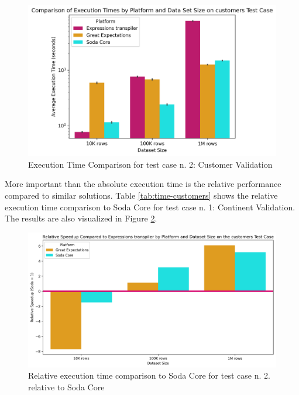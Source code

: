 \begin{table}[h] 
    \centering 
    \caption{Execution Time Comparison for test case n. 1: Continent Validation} 
    \label{tab:time-customers} 
    
\end{table}

\begin{figure}[htbp]
  \centering
  \includegraphics[width=1.0\columnwidth]{result-analysis/plots/execution_time_comparison_customers.png}
  \caption{Execution Time Comparison for test case n. 2: Customer Validation}
  \label{fig:time-comparison-customers}
\end{figure}


More important than the absolute execution time is the relative performance compared to similar solutions. Table \ref{tab:time-customers} shows the relative execution time comparison to Soda Core for test case n. 1: Continent Validation. The results are also visualized in Figure \ref{fig:time-comparison-customers-relative}.

\begin{table}[h] 
  \centering 
  \caption{Relative execution time comparison to Soda Core for test case n. 2: Customer Validation} 
  \label{tab:time-customers-relative} 
  
\end{table}

\begin{figure}[htbp]
  \centering
  \includegraphics[width=1.0\columnwidth]{result-analysis/plots/relative_speedup_comparison_customers.png}
  \caption{Relative execution time comparison to Soda Core for test case n. 2. relative to Soda Core}
  \label{fig:time-comparison-customers-relative}
\end{figure}

